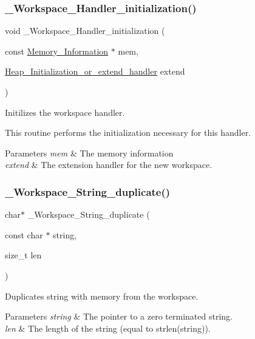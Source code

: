\subsubsection{\texorpdfstring{\_Workspace\_Handler\_initialization()}{\_Workspace\_Handler\_initialization()}}
{\footnotesize\ttfamily void \+\_\+\+Workspace\+\_\+\+Handler\+\_\+initialization (\begin{DoxyParamCaption}\item[{const \mbox{\hyperlink{structMemory__Information}{Memory\+\_\+\+Information}} $\ast$}]{mem,  }\item[{\mbox{\hyperlink{group__RTEMSScoreHeap_ga8953b692d39ca1c8a2780e9e8e2d9b1f}{Heap\+\_\+\+Initialization\+\_\+or\+\_\+extend\+\_\+handler}}}]{extend }\end{DoxyParamCaption})}



Initilizes the workspace handler. 

This routine performs the initialization necessary for this handler.


\begin{DoxyParams}{Parameters}
{\em mem} & The memory information \\
\hline
{\em extend} & The extension handler for the new workspace. \\
\hline
\end{DoxyParams}
\mbox{\label{group__RTEMSScoreWorkspace_ga8bc0640d72182fd63475e74dd58c298d}} 
\subsubsection{\texorpdfstring{\_Workspace\_String\_duplicate()}{\_Workspace\_String\_duplicate()}}
{\footnotesize\ttfamily char$\ast$ \+\_\+\+Workspace\+\_\+\+String\+\_\+duplicate (\begin{DoxyParamCaption}\item[{const char $\ast$}]{string,  }\item[{size\+\_\+t}]{len }\end{DoxyParamCaption})}



Duplicates string with memory from the workspace. 


\begin{DoxyParams}{Parameters}
{\em string} & The pointer to a zero terminated string. \\
\hline
{\em len} & The length of the string (equal to strlen(string)).\\
\hline
\end{DoxyParams}

